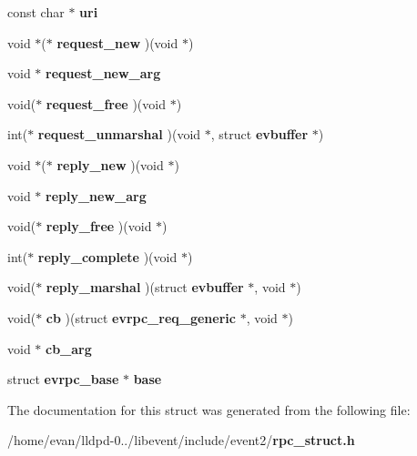 \begin{DoxyCompactItemize}
\item 
const char $\ast$ {\bfseries uri}\label{structevrpc_a69ec24fb2d0a5f5e532deb9adaab81d6}

\item 
void $\ast$($\ast$ {\bfseries request\-\_\-new} )(void $\ast$)\label{structevrpc_a6aa5f5acfc6dfd57eb4a6a99fac5f887}

\item 
void $\ast$ {\bfseries request\-\_\-new\-\_\-arg}\label{structevrpc_a5497d28f5ce86d993a593a95c222cbb1}

\item 
void($\ast$ {\bfseries request\-\_\-free} )(void $\ast$)\label{structevrpc_ab80460381cd1c1d88b15212d4a3c96c0}

\item 
int($\ast$ {\bfseries request\-\_\-unmarshal} )(void $\ast$, struct {\bf evbuffer} $\ast$)\label{structevrpc_a1efb0d96c22c958420b49f7194cea2a7}

\item 
void $\ast$($\ast$ {\bfseries reply\-\_\-new} )(void $\ast$)\label{structevrpc_a56db1d65516ec2659954ea95a4ea8200}

\item 
void $\ast$ {\bfseries reply\-\_\-new\-\_\-arg}\label{structevrpc_ac1a6d339dd892ce92e248650dfa91c3d}

\item 
void($\ast$ {\bfseries reply\-\_\-free} )(void $\ast$)\label{structevrpc_a52d2a39048051c7ac7af13c27c97d292}

\item 
int($\ast$ {\bfseries reply\-\_\-complete} )(void $\ast$)\label{structevrpc_afc1b9050892e1c3696131676a1f87fce}

\item 
void($\ast$ {\bfseries reply\-\_\-marshal} )(struct {\bf evbuffer} $\ast$, void $\ast$)\label{structevrpc_a586e5ba13b3bb0ea9afa9aceec87fb45}

\item 
void($\ast$ {\bfseries cb} )(struct {\bf evrpc\-\_\-req\-\_\-generic} $\ast$, void $\ast$)\label{structevrpc_a9c8efaa5beb47c7e0b1b42cef9e98f77}

\item 
void $\ast$ {\bfseries cb\-\_\-arg}\label{structevrpc_aa2a0fc874870115f7d31aabcbb53ec0b}

\item 
struct {\bf evrpc\-\_\-base} $\ast$ {\bfseries base}\label{structevrpc_ad7674d4fba7d27546bba899164a9c3b6}

\end{DoxyCompactItemize}


\-The documentation for this struct was generated from the following file\-:\begin{DoxyCompactItemize}
\item 
/home/evan/lldpd-\/0../libevent/include/event2/{\bf rpc\-\_\-struct.\-h}\end{DoxyCompactItemize}

